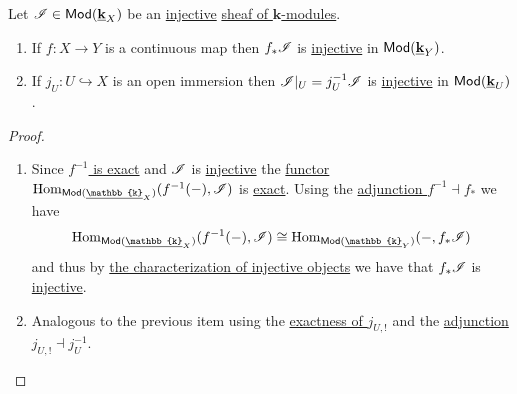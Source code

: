 \documentclass[../../main]{subfiles}
\begin{document}
\begin{lemma}\label{lemma:injective-sheaves-and-maps}
  Let \(\mathscr{I} \in \mathsf{Mod}(\underline{\mathbf{k}}_{X})\) be an \hyperref[def:injective-projective-object]{injective} \hyperref[def:sheaf]{sheaf of \(\mathbf{k}\)-modules}.
  \begin{enumerate}
    \item If \(f\colon X \to Y\) is a continuous map then \(f_{\ast}\mathscr{I}\) is \hyperref[def:injective-projective-object]{injective} in \(\mathsf{Mod}(\underline{\mathbf{k}}_{Y})\).
    \item If \(j_{U}\colon U \hookrightarrow X\) is an open immersion then \(\mathscr{I}|_{U} = j_{U}^{-1}\mathscr{I}\) is \hyperref[def:injective-projective-object]{injective} in \(\mathsf{Mod}(\underline{\mathbf{k}}_{U})\).
  \end{enumerate}
\end{lemma}
\begin{proof}~
  \begin{enumerate}
    \item Since \hyperref[cor:inverse-image-sheaf-exact]{\(f^{-1}\) is exact}  and \(\mathscr{I}\) is \hyperref[def:injective-projective-object]{injective} the \hyperref[def:functor]{functor} \(\Hom_{\Mod(\underline{\mathbb{k}}_{X})}(f^{-1}(-), \sheaf{I})\) is \hyperref[def:exact-functor]{exact}.
          Using the \hyperref[thm:direct-inverse-image-adjunction-sheaf]{adjunction \(f^{-1} \dashv f_{\ast}\)} we have
          \begin{equation*}
            \Hom_{\Mod(\underline{\mathbb{k}}_{X})}(f^{-1}(-), \sheaf{I}) \cong \Hom_{\Mod(\underline{\mathbb{k}}_{Y})}(-, f_{\ast}\sheaf{I})
          \end{equation*}
          and thus by \hyperref[prop:injective-characterization-hom]{the characterization of injective objects} we have that \(f_{\ast}\mathscr{I}\) is \hyperref[def:injective-projective-object]{injective}.
    \item Analogous to the previous item using the \hyperref[cor:extension-by-zero-sheaf-exact]{exactness of \(j_{U, !}\)} and the \hyperref[thm:open-immersion-adjunction-sheaf]{adjunction \(j_{U, !} \dashv j_{U}^{-1}\)}. \qedhere
  \end{enumerate}
\end{proof}
\end{document}
